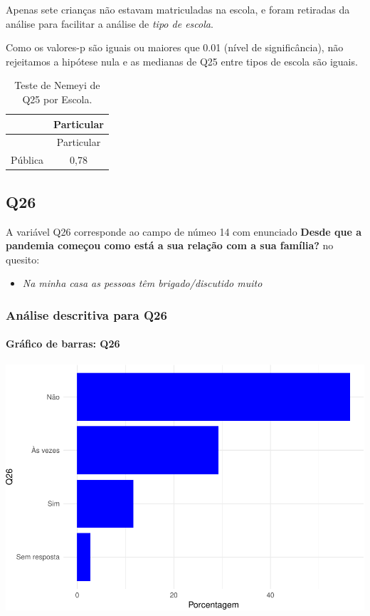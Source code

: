 \documentclass[]{article}
\providecommand{\tightlist}{%
  \setlength{\itemsep}{0pt}\setlength{\parskip}{0pt}}
\let\oldparagraph\paragraph
\renewcommand{\paragraph}[1]{\oldparagraph{#1}\mbox{}}
\begin{document}
Apenas sete crianças não estavam matriculadas na escola, e foram retiradas da análise para facilitar a análise de \emph{tipo de escola}.

Como os valores-p são iguais ou maiores que 0.01 (nível de significância), não rejeitamos a hipótese nula e as medianas de Q25 entre tipos de escola são iguais.

\begin{longtable}[]{@{}lc@{}}
\caption{\label{tab:unnamed-chunk-710}Teste de Nemeyi de Q25 por Escola.}\tabularnewline
\toprule
& Particular\tabularnewline
\midrule
\endfirsthead
\toprule
& Particular\tabularnewline
\midrule
\endhead
Pública & 0,78\tabularnewline
\bottomrule
\end{longtable}

\cleardoublepage

\hypertarget{q26}{%
\subsection{Q26}\label{q26}}

A variável Q26 corresponde ao campo de númeo 14 com enunciado \textbf{Desde que a pandemia começou como está a sua relação com a sua família?} no quesito:

\begin{itemize}
\tightlist
\item
  \emph{Na minha casa as pessoas têm brigado/discutido muito}
\end{itemize}

\hypertarget{anuxe1lise-descritiva-para-q26}{%
\subsubsection{Análise descritiva para Q26}\label{anuxe1lise-descritiva-para-q26}}

\hypertarget{gruxe1fico-de-barras-q26}{%
\paragraph{Gráfico de barras: Q26}\label{gruxe1fico-de-barras-q26}}

\begin{center}\includegraphics[width=0.75\linewidth]{relatorio_covid19_files/figure-latex/unnamed-chunk-717-1} \end{center}
\end{document}
